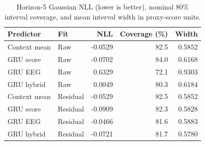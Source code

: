 \begin{table}[!ht]
\centering
\small
\setlength{\tabcolsep}{5pt}
\renewcommand{\arraystretch}{1.1}
\caption{Horizon-5 Gaussian NLL (lower is better), nominal 80\% interval coverage, and mean interval width in proxy-score units.}
\label{tab:supp_uncertainty}
\begin{tabular}{llrrr}
\toprule
Predictor & Fit & NLL & Coverage (\%) & Width \\
\midrule
Context mean & Raw & -0.0529 & 82.5 & 0.5852 \\
GRU score & Raw & -0.0702 & 84.0 & 0.6168 \\
GRU EEG & Raw & 0.6329 & 72.1 & 0.9303 \\
GRU hybrid & Raw & 0.0049 & 80.3 & 0.6184 \\
Context mean & Residual & -0.0529 & 82.5 & 0.5852 \\
GRU score & Residual & -0.0909 & 82.3 & 0.5828 \\
GRU EEG & Residual & -0.0466 & 81.6 & 0.5883 \\
GRU hybrid & Residual & -0.0721 & 81.7 & 0.5780 \\
\bottomrule
\end{tabular}
\end{table}
